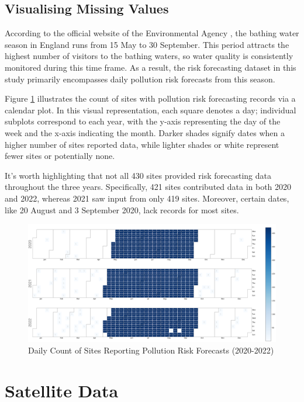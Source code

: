 \documentclass[a4paper,11pt]{report}
\begin{document}
\subsection{Visualising Missing Values}

According to the official website of the Environmental Agency \citep{Bathing}, the bathing water season in England runs from 15 May to 30 September. This period attracts the highest number of visitors to the bathing waters, so water quality is consistently monitored during this time frame. As a result, the risk forecasting dataset in this study primarily encompasses daily pollution risk forecasts from this season.

Figure \ref{fig:bath2} illustrates the count of sites with pollution risk forecasting records via a calendar plot. In this visual representation, each square denotes a day; individual subplots correspond to each year, with the y-axis representing the day of the week and the x-axis indicating the month. Darker shades signify dates when a higher number of sites reported data, while lighter shades or white represent fewer sites or potentially none.

It's worth highlighting that not all 430 sites provided risk forecasting data throughout the three years. Specifically, 421 sites contributed data in both 2020 and 2022, whereas 2021 saw input from only 419 sites. Moreover, certain dates, like 20 August and 3 September 2020, lack records for most sites.

\begin{figure}[H]
\centering
\includegraphics[width=\textwidth]{images/Bathing_water_missing_data.png}
\caption{Daily Count of Sites Reporting Pollution Risk Forecasts (2020-2022)}
\label{fig:bath2}
\end{figure}

\section{Satellite Data}
\end{document}
